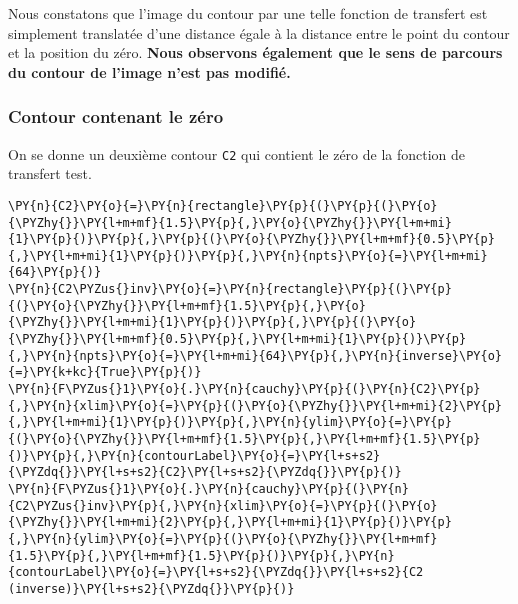 Nous constatons que l'image du contour par une telle fonction de
transfert est simplement translatée d'une distance égale à la distance
entre le point du contour et la position du zéro. \textbf{Nous observons
également que le sens de parcours du contour de l'image n'est pas
modifié.}

\hypertarget{contour-contenant-le-zuxe9ro}{%
\subsubsection{Contour contenant le
zéro}\label{contour-contenant-le-zuxe9ro}}

On se donne un deuxième contour \texttt{C2} qui contient le zéro de la
fonction de transfert test.

    \begin{tcolorbox}[breakable, size=fbox, boxrule=1pt, pad at break*=1mm,colback=cellbackground, colframe=cellborder]
\begin{Verbatim}[commandchars=\\\{\}]
\PY{n}{C2}\PY{o}{=}\PY{n}{rectangle}\PY{p}{(}\PY{p}{(}\PY{o}{\PYZhy{}}\PY{l+m+mf}{1.5}\PY{p}{,}\PY{o}{\PYZhy{}}\PY{l+m+mi}{1}\PY{p}{)}\PY{p}{,}\PY{p}{(}\PY{o}{\PYZhy{}}\PY{l+m+mf}{0.5}\PY{p}{,}\PY{l+m+mi}{1}\PY{p}{)}\PY{p}{,}\PY{n}{npts}\PY{o}{=}\PY{l+m+mi}{64}\PY{p}{)}
\PY{n}{C2\PYZus{}inv}\PY{o}{=}\PY{n}{rectangle}\PY{p}{(}\PY{p}{(}\PY{o}{\PYZhy{}}\PY{l+m+mf}{1.5}\PY{p}{,}\PY{o}{\PYZhy{}}\PY{l+m+mi}{1}\PY{p}{)}\PY{p}{,}\PY{p}{(}\PY{o}{\PYZhy{}}\PY{l+m+mf}{0.5}\PY{p}{,}\PY{l+m+mi}{1}\PY{p}{)}\PY{p}{,}\PY{n}{npts}\PY{o}{=}\PY{l+m+mi}{64}\PY{p}{,}\PY{n}{inverse}\PY{o}{=}\PY{k+kc}{True}\PY{p}{)}
\PY{n}{F\PYZus{}1}\PY{o}{.}\PY{n}{cauchy}\PY{p}{(}\PY{n}{C2}\PY{p}{,}\PY{n}{xlim}\PY{o}{=}\PY{p}{(}\PY{o}{\PYZhy{}}\PY{l+m+mi}{2}\PY{p}{,}\PY{l+m+mi}{1}\PY{p}{)}\PY{p}{,}\PY{n}{ylim}\PY{o}{=}\PY{p}{(}\PY{o}{\PYZhy{}}\PY{l+m+mf}{1.5}\PY{p}{,}\PY{l+m+mf}{1.5}\PY{p}{)}\PY{p}{,}\PY{n}{contourLabel}\PY{o}{=}\PY{l+s+s2}{\PYZdq{}}\PY{l+s+s2}{C2}\PY{l+s+s2}{\PYZdq{}}\PY{p}{)}
\PY{n}{F\PYZus{}1}\PY{o}{.}\PY{n}{cauchy}\PY{p}{(}\PY{n}{C2\PYZus{}inv}\PY{p}{,}\PY{n}{xlim}\PY{o}{=}\PY{p}{(}\PY{o}{\PYZhy{}}\PY{l+m+mi}{2}\PY{p}{,}\PY{l+m+mi}{1}\PY{p}{)}\PY{p}{,}\PY{n}{ylim}\PY{o}{=}\PY{p}{(}\PY{o}{\PYZhy{}}\PY{l+m+mf}{1.5}\PY{p}{,}\PY{l+m+mf}{1.5}\PY{p}{)}\PY{p}{,}\PY{n}{contourLabel}\PY{o}{=}\PY{l+s+s2}{\PYZdq{}}\PY{l+s+s2}{C2 (inverse)}\PY{l+s+s2}{\PYZdq{}}\PY{p}{)}
\end{Verbatim}
\end{tcolorbox}

